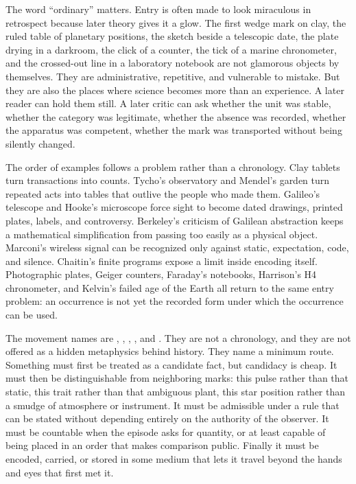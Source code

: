 \begin{chapteressay}
The word ``ordinary'' matters. Entry is often made to look miraculous in
retrospect because later theory gives it a glow. The first wedge mark on clay,
the ruled table of planetary positions, the sketch beside a telescopic date,
the plate drying in a darkroom, the click of a counter, the tick of a marine
chronometer, and the crossed-out line in a laboratory notebook are not glamorous
objects by themselves. They are administrative, repetitive, and vulnerable to
mistake. But they are also the places where science becomes more than an
experience. A later reader can hold them still. A later critic can ask whether
the unit was stable, whether the category was legitimate, whether the absence
was recorded, whether the apparatus was competent, whether the mark was
transported without being silently changed.

The order of examples follows a problem rather than a chronology. Clay tablets
turn transactions into counts. Tycho's observatory and Mendel's garden turn
repeated acts into tables that outlive the people who made them. Galileo's
telescope and Hooke's microscope force sight to become dated drawings, printed
plates, labels, and controversy. Berkeley's criticism of Galilean abstraction
keeps a mathematical simplification from passing too easily as a physical
object. Marconi's wireless signal can be recognized only against static,
expectation, code, and silence. Chaitin's finite programs expose a limit inside
encoding itself. Photographic plates, Geiger counters, Faraday's notebooks,
Harrison's H4 chronometer, and Kelvin's failed age of the Earth all return to
the same entry problem: an occurrence is not yet the recorded form under which
the occurrence can be used.

The movement names are , ,
, , and . They are not a
chronology, and they are not offered as a hidden metaphysics behind history.
They name a minimum route. Something must first be treated as a candidate fact,
but candidacy is cheap. It must then be distinguishable from neighboring marks:
this pulse rather than that static, this trait rather than that ambiguous plant,
this star position rather than a smudge of atmosphere or instrument. It must be
admissible under a rule that can be stated without depending entirely on the
authority of the observer. It must be countable when the episode asks for
quantity, or at least capable of being placed in an order that makes comparison
public. Finally it must be encoded, carried, or stored in some medium that lets
it travel beyond the hands and eyes that first met it.


\end{chapteressay}
